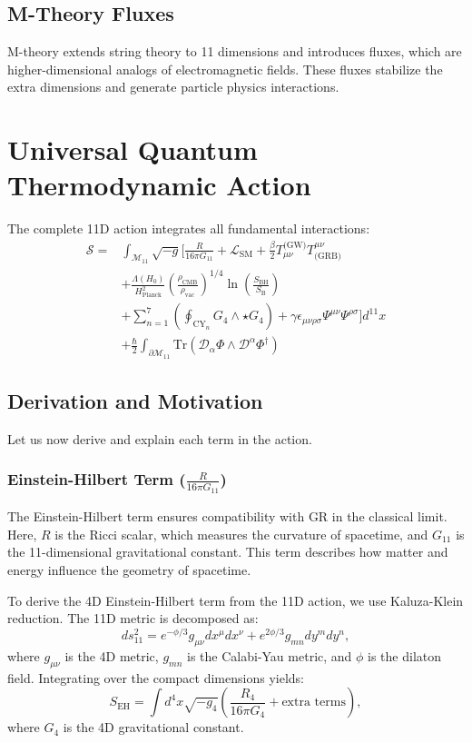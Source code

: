 \documentclass[12pt, a4paper]{article}
\begin{document}
\subsection{M-Theory Fluxes}
M-theory extends string theory to 11 dimensions and introduces fluxes, which are higher-dimensional analogs of electromagnetic fields. These fluxes stabilize the extra dimensions and generate particle physics interactions.

\section{Universal Quantum Thermodynamic Action}
The complete 11D action integrates all fundamental interactions:
\[
\boxed{
\begin{aligned}
\mathcal{S} = & \int_{\mathcal{M}_{11}} \sqrt{-g} \Bigg[ \frac{R}{16\pi G_{11}} + \mathcal{L}_{\text{SM}} + \frac{\beta}{2} T_{\mu\nu}^{\text{(GW)}} T^{\mu\nu}_{\text{(GRB)}} \\
& + \frac{\Lambda(H_0)}{H_{\text{Planck}}^2} \left( \frac{\rho_{\text{CMB}}}{\rho_{\text{vac}}} \right)^{1/4} \ln\left(\frac{S_{\text{BH}}}{S_{\text{B}}}\right) \\
& + \sum_{n=1}^7 \left( \oint_{\text{CY}_n} G_4 \wedge \star G_4 \right) + \gamma \epsilon_{\mu\nu\rho\sigma} \Psi^{\mu\nu} \Psi^{\rho\sigma} \Bigg] d^{11}x \\
& + \frac{\hbar}{2} \int_{\partial\mathcal{M}_{11}} \text{Tr}\left( \mathcal{D}_\alpha \Phi \wedge \mathcal{D}^\alpha \Phi^\dagger \right)
\end{aligned}
}
\]

\subsection{Derivation and Motivation}
Let us now derive and explain each term in the action.

\subsubsection{Einstein-Hilbert Term ($\frac{R}{16\pi G_{11}}$)}
The Einstein-Hilbert term ensures compatibility with GR in the classical limit. Here, $R$ is the Ricci scalar, which measures the curvature of spacetime, and $G_{11}$ is the 11-dimensional gravitational constant. This term describes how matter and energy influence the geometry of spacetime.

To derive the 4D Einstein-Hilbert term from the 11D action, we use Kaluza-Klein reduction. The 11D metric is decomposed as:
\[
ds^2_{11} = e^{-\phi/3} g_{\mu\nu}dx^\mu dx^\nu + e^{2\phi/3} g_{mn}dy^m dy^n,
\]
where \(g_{\mu\nu}\) is the 4D metric, \(g_{mn}\) is the Calabi-Yau metric, and \(\phi\) is the dilaton field. Integrating over the compact dimensions yields:
\[
S_{\text{EH}} = \int d^4x \sqrt{-g_4} \left( \frac{R_4}{16\pi G_4} + \text{extra terms} \right),
\]
where \(G_4\) is the 4D gravitational constant.
\end{document}
